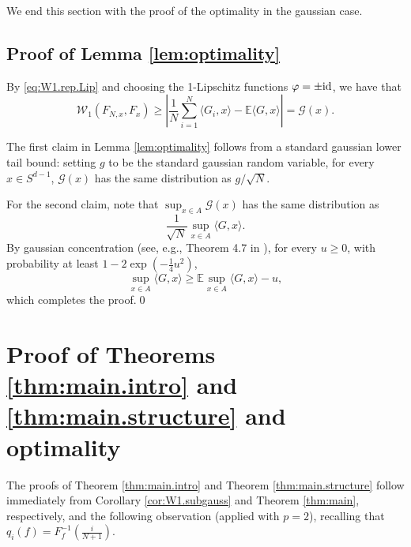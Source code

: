 \documentclass[11pt]{amsart}
\newcommand{\W}{\mathcal{W}}
\theoremstyle{definition}
\newcommand{\E}{\mathbb{E}}
\numberwithin{equation}{section}
\begin{document}
We end this section with the proof of the optimality in the gaussian case.

\subsection{Proof of Lemma \ref{lem:optimality}}

By  \eqref{eq:W1.rep.Lip} and choosing the 1-Lipschitz functions $\varphi = \pm {\rm id}$, we have that
\[ \W_1(F_{N,x} ,  F_{x})
 \geq \left | \frac{1}{N}\sum_{i=1}^{N} \langle G_{i},x\rangle - \E \langle G,x\rangle \right|
=\mathcal{G}(x). \]

The first claim in Lemma \ref{lem:optimality} follows  from a standard gaussian lower tail bound:
setting $g$ to be the standard gaussian random variable, for every $x\in S^{d-1}$,  $\mathcal{G}(x)$ has the same distribution as $g/\sqrt N$.

For the second claim,  note that  $\sup_{x\in A} \mathcal{G}(x)$ has the same distribution as
\[ \frac{1}{\sqrt N}  \sup_{x\in A } \langle G, x\rangle.\]
By gaussian concentration (see, e.g., Theorem 4.7 in  \cite{pisier1999volume}), for every $u \geq 0$,  with probability at least $1-2\exp(-\frac{1}{4}u^{2})$,
\[\sup_{x\in A } \langle G, x\rangle \geq \E \sup_{x\in A } \langle G, x\rangle - u,\]
which completes the proof.\qed






\section{Proof of Theorems \ref{thm:main.intro} and \ref{thm:main.structure} and optimality}
\label{sec:proof.structure}

The  proofs of Theorem \ref{thm:main.intro} and Theorem \ref{thm:main.structure} follow immediately from Corollary \ref{cor:W1.subgauss} and Theorem \ref{thm:main}, respectively, and the following observation (applied with $p=2$), recalling that  $q_i(f) = F_f^{-1}(\frac{i}{N+1})$. 
\end{document}
